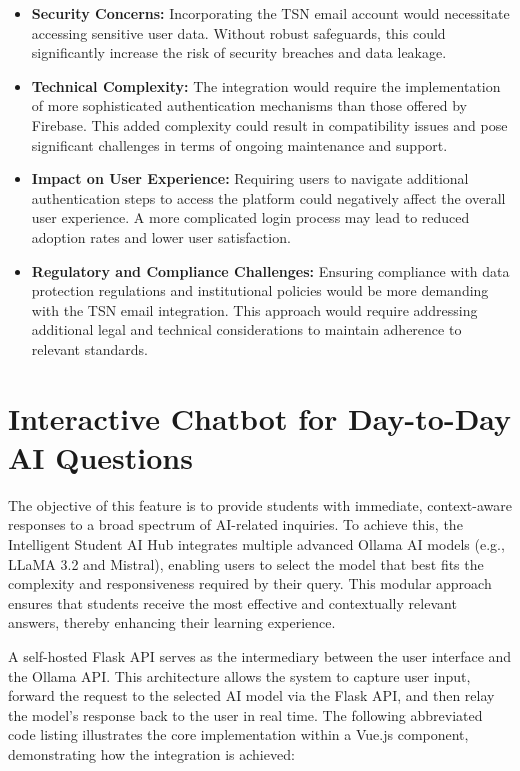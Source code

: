 \begin{itemize}
    \item \textbf{Security Concerns:} Incorporating the TSN email account would necessitate accessing sensitive user data. Without robust safeguards, this could significantly increase the risk of security breaches and data leakage.
    \item \textbf{Technical Complexity:} The integration would require the implementation of more sophisticated authentication mechanisms than those offered by Firebase. This added complexity could result in compatibility issues and pose significant challenges in terms of ongoing maintenance and support.
    \item \textbf{Impact on User Experience:} Requiring users to navigate additional authentication steps to access the platform could negatively affect the overall user experience. A more complicated login process may lead to reduced adoption rates and lower user satisfaction.
    \item \textbf{Regulatory and Compliance Challenges:} Ensuring compliance with data protection regulations and institutional policies would be more demanding with the TSN email integration. This approach would require addressing additional legal and technical considerations to maintain adherence to relevant standards.
\end{itemize}


\section{Interactive Chatbot for Day-to-Day AI Questions}

The objective of this feature is to provide students with immediate, context-aware responses to a broad spectrum of AI-related inquiries. To achieve this, the Intelligent Student AI Hub integrates multiple advanced Ollama AI models (e.g., LLaMA 3.2 and Mistral), enabling users to select the model that best fits the complexity and responsiveness required by their query. This modular approach ensures that students receive the most effective and contextually relevant answers, thereby enhancing their learning experience.

A self-hosted Flask API serves as the intermediary between the user interface and the Ollama API. This architecture allows the system to capture user input, forward the request to the selected AI model via the Flask API, and then relay the model's response back to the user in real time. The following abbreviated code listing illustrates the core implementation within a Vue.js component, demonstrating how the integration is achieved:

